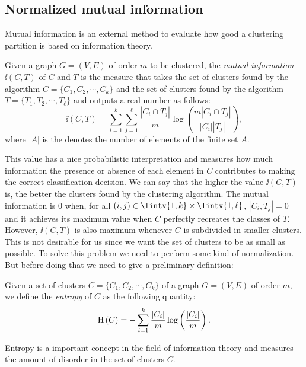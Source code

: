 \subsection{Normalized mutual information}
Mutual information is an external method to evaluate how good a clustering partition is based on information theory.

\begin{definition}
   Given a graph $G = (V,E)$ of order $m$ to be clustered, the \textit{mutual information} $\ii (C, T)$ of $C$ and $T$ is the measure that takes the set of clusters found by the algorithm $C = \{ C_1, C_2, \cdots, C_k \}$ and the set of clusters found by the algorithm $T = \{ T_1, T_2, \cdots, T_\ell \}$ and outputs a real number as follows:
\begin{equation}
   \ii (C, T) = \sum_{i=1}^k \sum _{j=1}^\ell \frac{|C_i \cap T_j|}{m} \log \left( \frac{m |C_i \cap T_j|}{|C_i| |T_j|} \right),
\end{equation}
where $|A|$ is the denotes the number of elements of the finite set $A$.
\end{definition}

This value has a nice probabilistic interpretation and measures how much information the presence or absence of each element in $C$ contributes to making the correct classification decision. 
We can say that the higher the value $\ii (C, T)$ is, the better the clusters found by the clustering algorithm.
The mutual information is $0$ when, for all $(i,j) \in \Iintv{1,k} \times \Iintv{1,\ell}$, $|C_i,T_j| = 0$ and it achieves its maximum value when $C$ perfectly recreates the classes of $T$.
However, $\ii (C,T)$ is also maximum whenever $C$ is subdivided in smaller clusters.
This is not desirable for us since we want the set of clusters to be as small as possible.
To solve this problem we need to perform some kind of normalization.
But before doing that we need to give a preliminary definition:

\begin{definition}
   Given a set of clusters $C = \{C_1, C_2, \cdots, C_k \}$ of a graph $G=(V,E)$ of order $m$, we define the \textit{entropy} of $C$ as the following quantity:
\begin{equation}
   \operatorname{H\,} (C) = - \sum_{i=1}^k \frac{|C_i|}{m} \log \left( \frac{|C_i|}{m} \right) .
   \end{equation}
\end{definition}

Entropy is a important concept in the field of information theory and measures the amount of disorder in the set of clusters $C$.  

